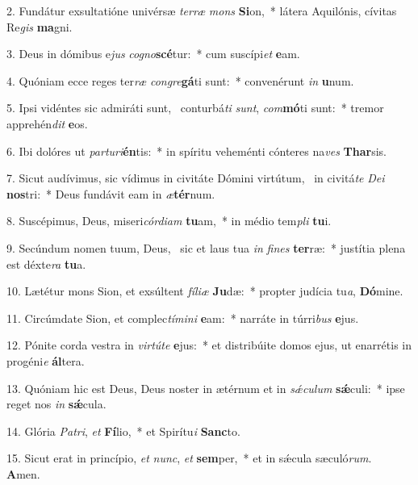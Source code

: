 2. Fundátur exsultatióne univérsæ \textit{ter}\textit{ræ} \textit{mons} \textbf{Si}on,~*  látera Aquilónis, cívitas Re\textit{gis} \textbf{ma}gni.\

3. Deus in dómibus e\textit{jus} \textit{co}\textit{gno}\textbf{scé}tur:~*  cum suscípi\textit{et} \textbf{e}am.\

4. Quóniam ecce reges ter\textit{ræ} \textit{con}\textit{gre}\textbf{gá}ti sunt:~*  convenérunt \textit{in} \textbf{u}num.\

5. Ipsi vidéntes sic admiráti sunt, \dag\  conturbá\textit{ti} \textit{sunt}, \textit{com}\textbf{mó}ti sunt:~*  tremor apprehén\textit{dit} \textbf{e}os.\

6. Ibi dolóres ut \textit{par}\textit{tu}\textit{ri}\textbf{én}tis:~*  in spíritu veheménti cónteres na\textit{ves} \textbf{Thar}sis.\

7. Sicut audívimus, sic vídimus in civitáte Dómini virtútum, \dag\  in civitá\textit{te} \textit{De}\textit{i} \textbf{nos}tri:~*  Deus fundávit eam in \textit{æ}\textbf{tér}num.\

8. Suscépimus, Deus, miseri\textit{cór}\textit{di}\textit{am} \textbf{tu}am,~*  in médio tem\textit{pli} \textbf{tu}i.\

9. Secúndum nomen tuum, Deus, \dag\  sic et laus tua \textit{in} \textit{fi}\textit{nes} \textbf{ter}ræ:~*  justítia plena est déxte\textit{ra} \textbf{tu}a.\

10. Lætétur mons Sion, et exsúltent \textit{fí}\textit{li}\textit{æ} \textbf{Ju}dæ:~*  propter judícia tu\textit{a}, \textbf{Dó}mine.\

11. Circúmdate Sion, et complec\textit{tí}\textit{mi}\textit{ni} \textbf{e}am:~*  narráte in túrri\textit{bus} \textbf{e}jus.\

12. Pónite corda vestra in \textit{vir}\textit{tú}\textit{te} \textbf{e}jus:~*  et distribúite domos ejus, ut enarrétis in progéni\textit{e} \textbf{ál}tera.\

13. Quóniam hic est Deus, Deus noster in ætérnum et in \textit{sǽ}\textit{cu}\textit{lum} \textbf{sǽ}culi:~*  ipse reget nos \textit{in} \textbf{sǽ}cula.\

14. Glória \textit{Pa}\textit{tri}, \textit{et} \textbf{Fí}lio,~*  et Spirítu\textit{i} \textbf{Sanc}to.\

15. Sicut erat in princípio, \textit{et} \textit{nunc}, \textit{et} \textbf{sem}per,~*  et in sǽcula sæculó\textit{rum}. \textbf{A}men.\

